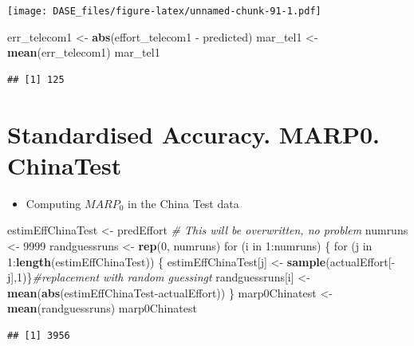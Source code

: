 \documentclass[]{book}
\newenvironment{Shaded}{\begin{snugshade}}{\end{snugshade}}
\newcommand{\KeywordTok}[1]{\textcolor[rgb]{0.13,0.29,0.53}{\textbf{{#1}}}}
\newcommand{\DecValTok}[1]{\textcolor[rgb]{0.00,0.00,0.81}{{#1}}}
\newcommand{\StringTok}[1]{\textcolor[rgb]{0.31,0.60,0.02}{{#1}}}
\newcommand{\CommentTok}[1]{\textcolor[rgb]{0.56,0.35,0.01}{\textit{{#1}}}}
\newcommand{\NormalTok}[1]{{#1}}
\providecommand{\tightlist}{%
  \setlength{\itemsep}{0pt}\setlength{\parskip}{0pt}}
\begin{document}
\texttt{[image: DASE\_files/figure-latex/unnamed-chunk-91-1.pdf]}

\begin{Shaded}
\begin{Highlighting}[]
\NormalTok{err_telecom1 <-}\StringTok{ }\KeywordTok{abs}\NormalTok{(effort_telecom1 -}\StringTok{ }\NormalTok{predicted)}
\NormalTok{mar_tel1 <-}\StringTok{ }\KeywordTok{mean}\NormalTok{(err_telecom1)}
\NormalTok{mar_tel1}
\end{Highlighting}
\end{Shaded}

\begin{verbatim}
## [1] 125
\end{verbatim}

\section{Standardised Accuracy. MARP0.
ChinaTest}\label{standardised-accuracy.-marp0.-chinatest}

\begin{itemize}
\tightlist
\item
  Computing \(MARP_0\) in the China Test data
\end{itemize}

\begin{Shaded}
\begin{Highlighting}[]
\NormalTok{estimEffChinaTest <-}\StringTok{ }\NormalTok{predEffort  }\CommentTok{# This will be overwritten, no problem}
\NormalTok{numruns <-}\StringTok{ }\DecValTok{9999}
\NormalTok{randguessruns <-}\StringTok{ }\KeywordTok{rep}\NormalTok{(}\DecValTok{0}\NormalTok{, numruns)}
\NormalTok{for (i in }\DecValTok{1}\NormalTok{:numruns) \{ }
  \NormalTok{for (j in }\DecValTok{1}\NormalTok{:}\KeywordTok{length}\NormalTok{(estimEffChinaTest)) \{}
    \NormalTok{estimEffChinaTest[j] <-}\StringTok{ }\KeywordTok{sample}\NormalTok{(actualEffort[-j],}\DecValTok{1}\NormalTok{)\}}\CommentTok{#replacement with random guessingt    }
  \NormalTok{randguessruns[i] <-}\StringTok{ }\KeywordTok{mean}\NormalTok{(}\KeywordTok{abs}\NormalTok{(estimEffChinaTest-actualEffort))}
  \NormalTok{\} }
\NormalTok{marp0Chinatest <-}\StringTok{ }\KeywordTok{mean}\NormalTok{(randguessruns)}
\NormalTok{marp0Chinatest}
\end{Highlighting}
\end{Shaded}

\begin{verbatim}
## [1] 3956
\end{verbatim}
\end{document}
